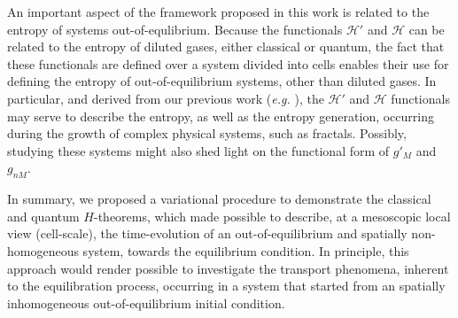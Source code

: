 An important aspect of the framework proposed in this work is related to the entropy of systems
out-of-equlibrium. Because the functionals $\mathcal{H}'$ and $\mathcal{H}$ can be related to
the entropy of diluted gases, either classical or quantum, the fact that these functionals are defined
over a system divided into cells enables their use for defining the entropy
of out-of-equilibrium systems, other than diluted gases. In particular, and 
derived from our previous work (\textit{e.g.} \cite{bib:nicolas2020,bib:nicolas2016}), the
$\mathcal H'$ and $\mathcal H$ functionals may serve to describe the entropy,
as well as the entropy generation, occurring during the
growth of complex physical systems, such as fractals. Possibly, studying these systems might also
shed light on the functional form of $g'_M$ and $g_{nM}$.

In summary, we proposed a variational procedure to demonstrate the classical and
quantum $H$-theorems, which made possible to describe, at a mesoscopic local view
(cell-scale), the time-evolution of an out-of-equilibrium and spatially
non-homogeneous system, towards the equilibrium condition. In principle, this
approach would render possible to investigate the transport phenomena, inherent to the
equilibration process, occurring in a system that started from an spatially inhomogeneous
out-of-equilibrium initial condition. 



